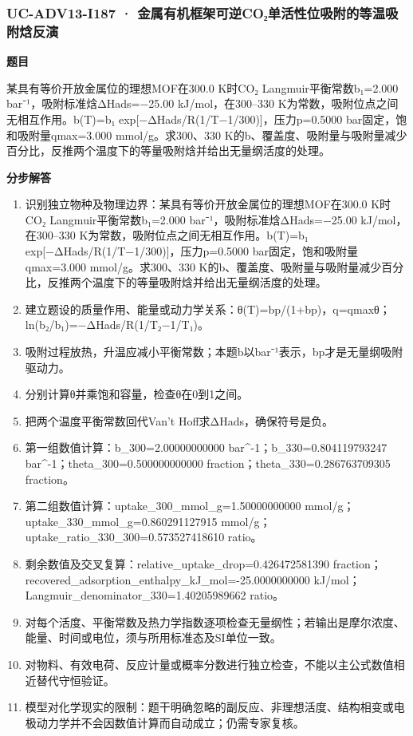 \documentclass[UTF8,11pt,a4paper]{ctexart}
\begin{document}
\subsubsection*{UC-ADV13-I187 · 金属有机框架可逆CO₂单活性位吸附的等温吸附焓反演}
\noindent\textbf{题目}\par
某具有等价开放金属位的理想MOF在300.0 K时CO₂ Langmuir平衡常数b₁=2.000 bar⁻¹，吸附标准焓ΔHads=−25.00 kJ/mol，在300–330 K为常数，吸附位点之间无相互作用。b(T)=b₁ exp[−ΔHads/R(1/T−1/300)]，压力p=0.5000 bar固定，饱和吸附量qmax=3.000 mmol/g。求300、330 K的b、覆盖度、吸附量与吸附量减少百分比，反推两个温度下的等量吸附焓并给出无量纲活度的处理。\par
\medskip\noindent\textbf{分步解答}
\begin{enumerate}
\item 识别独立物种及物理边界：某具有等价开放金属位的理想MOF在300.0 K时CO₂ Langmuir平衡常数b₁=2.000 bar⁻¹，吸附标准焓ΔHads=−25.00 kJ/mol，在300–330 K为常数，吸附位点之间无相互作用。b(T)=b₁ exp[−ΔHads/R(1/T−1/300)]，压力p=0.5000 bar固定，饱和吸附量qmax=3.000 mmol/g。求300、330 K的b、覆盖度、吸附量与吸附量减少百分比，反推两个温度下的等量吸附焓并给出无量纲活度的处理。
\item 建立题设的质量作用、能量或动力学关系：θ(T)=bp/(1+bp)，q=qmaxθ；ln(b₂/b₁)=−ΔHads/R(1/T₂−1/T₁)。
\item 吸附过程放热，升温应减小平衡常数；本题b以bar⁻¹表示，bp才是无量纲吸附驱动力。
\item 分别计算θ并乘饱和容量，检查θ在0到1之间。
\item 把两个温度平衡常数回代Van’t Hoff求ΔHads，确保符号是负。
\item 第一组数值计算：b\_300=2.00000000000 bar\textasciicircum{}-1；b\_330=0.804119793247 bar\textasciicircum{}-1；theta\_300=0.500000000000 fraction；theta\_330=0.286763709305 fraction。
\item 第二组数值计算：uptake\_300\_mmol\_g=1.50000000000 mmol/g；uptake\_330\_mmol\_g=0.860291127915 mmol/g；uptake\_ratio\_330\_300=0.573527418610 ratio。
\item 剩余数值及交叉复算：relative\_uptake\_drop=0.426472581390 fraction；recovered\_adsorption\_enthalpy\_kJ\_mol=-25.0000000000 kJ/mol；Langmuir\_denominator\_330=1.40205989662 ratio。
\item 对每个活度、平衡常数及热力学指数逐项检查无量纲性；若输出是摩尔浓度、能量、时间或电位，须与所用标准态及SI单位一致。
\item 对物料、有效电荷、反应计量或概率分数进行独立检查，不能以主公式数值相近替代守恒验证。
\item 模型对化学现实的限制：题干明确忽略的副反应、非理想活度、结构相变或电极动力学并不会因数值计算而自动成立；仍需专家复核。
\end{enumerate}
\end{document}
